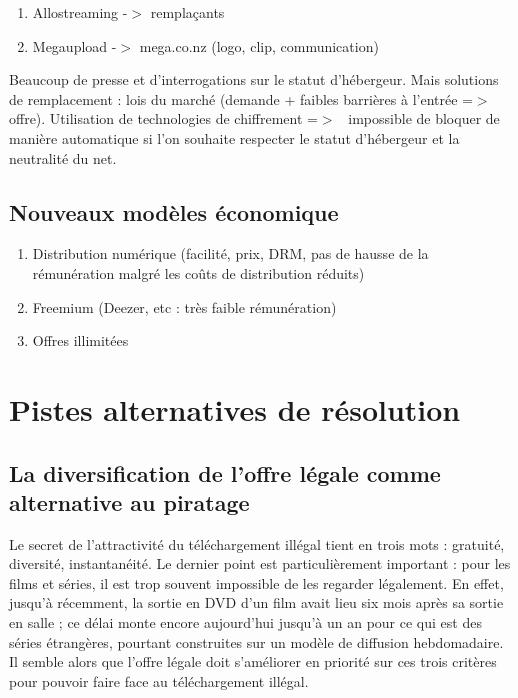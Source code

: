 \documentclass[a4paper]{report}
\begin{document}
	\begin{enumerate}
		\item Allostreaming -$>$ remplaçants
		\item Megaupload -$>$ mega.co.nz (logo, clip, communication)
	\end{enumerate}
	Beaucoup de presse et d'interrogations sur le statut d'hébergeur. Mais solutions de remplacement : lois du marché (demande + faibles barrières à l'entrée =$>$ offre).
	Utilisation de technologies de chiffrement =$>$ ~impossible de bloquer de manière automatique si l'on souhaite respecter le statut d'hébergeur et la neutralité du net.

	\section{Nouveaux modèles économique}
	\begin{enumerate}
		\item Distribution numérique (facilité, prix, DRM, pas de hausse de la rémunération malgré les coûts de distribution réduits)
		\item Freemium (Deezer, etc : très faible rémunération)
		\item Offres illimitées
	\end{enumerate}





	\chapter{Pistes alternatives de résolution}

	\section{La diversification de l'offre légale comme alternative au piratage}
	Le secret de l'attractivité du téléchargement illégal tient en trois mots : gratuité, diversité, instantanéité. Le dernier point est particulièrement important : pour les films et séries, il est trop souvent impossible de les regarder légalement. En effet, jusqu'à récemment, la sortie en DVD d'un film avait lieu six mois après sa sortie en salle ; ce délai monte encore aujourd'hui jusqu'à un an pour ce qui est des séries étrangères, pourtant construites sur un modèle de diffusion hebdomadaire. Il semble alors que l'offre légale doit s'améliorer en priorité sur ces trois critères pour pouvoir faire face au téléchargement illégal.\\
\end{document}
